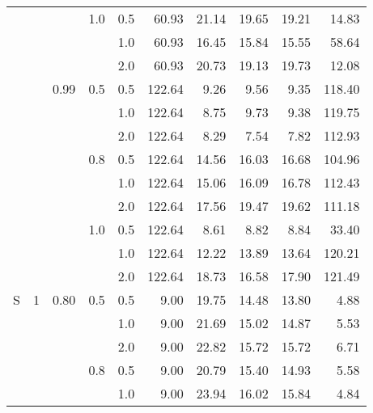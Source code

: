 \documentclass{article}
\begin{document}
{\begin{tabular}{lllllrrrrr}
            &     &      & 1.0 & 0.5 &   60.93 &   21.14 &             19.65 &                19.21 &      14.83 \\
            &     &      &     & 1.0 &   60.93 &   16.45 &             15.84 &                15.55 &      58.64 \\
            &     &      &     & 2.0 &   60.93 &   20.73 &             19.13 &                19.73 &      12.08 \\
            &     & 0.99 & 0.5 & 0.5 &  122.64 &    9.26 &              9.56 &                 9.35 &     118.40 \\
            &     &      &     & 1.0 &  122.64 &    8.75 &              9.73 &                 9.38 &     119.75 \\
            &     &      &     & 2.0 &  122.64 &    8.29 &              7.54 &                 7.82 &     112.93 \\
            &     &      & 0.8 & 0.5 &  122.64 &   14.56 &             16.03 &                16.68 &     104.96 \\
            &     &      &     & 1.0 &  122.64 &   15.06 &             16.09 &                16.78 &     112.43 \\
            &     &      &     & 2.0 &  122.64 &   17.56 &             19.47 &                19.62 &     111.18 \\
            &     &      & 1.0 & 0.5 &  122.64 &    8.61 &              8.82 &                 8.84 &      33.40 \\
            &     &      &     & 1.0 &  122.64 &   12.22 &             13.89 &                13.64 &     120.21 \\
            &     &      &     & 2.0 &  122.64 &   18.73 &             16.58 &                17.90 &     121.49 \\
          S & 1 & 0.80 & 0.5 & 0.5 &    9.00 &   19.75 &             14.48 &                13.80 &       4.88 \\
            &     &      &     & 1.0 &    9.00 &   21.69 &             15.02 &                14.87 &       5.53 \\
            &     &      &     & 2.0 &    9.00 &   22.82 &             15.72 &                15.72 &       6.71 \\
            &     &      & 0.8 & 0.5 &    9.00 &   20.79 &             15.40 &                14.93 &       5.58 \\
            &     &      &     & 1.0 &    9.00 &   23.94 &             16.02 &                15.84 &       4.84 \\

\end{tabular}}
\end{document}
